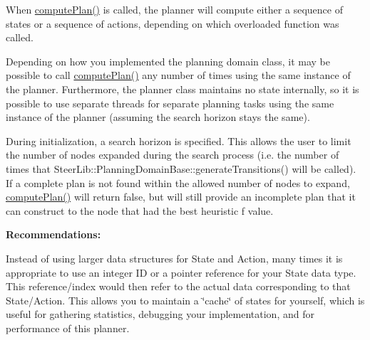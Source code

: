 \begin{DoxyItemize}
\item When \hyperlink{class_best_first_search_planner_a777fb06939a33b3f3effb24b0dbda076}{compute\-Plan()} is called, the planner will compute either a sequence of states or a sequence of actions, depending on which overloaded function was called.
\end{DoxyItemize}


\begin{DoxyItemize}
\item Depending on how you implemented the planning domain class, it may be possible to call \hyperlink{class_best_first_search_planner_a777fb06939a33b3f3effb24b0dbda076}{compute\-Plan()} any number of times using the same instance of the planner. Furthermore, the planner class maintains no state internally, so it is possible to use separate threads for separate planning tasks using the same instance of the planner (assuming the search horizon stays the same).
\end{DoxyItemize}


\begin{DoxyItemize}
\item During initialization, a search horizon is specified. This allows the user to limit the number of nodes expanded during the search process (i.\-e. the number of times that Steer\-Lib\-::\-Planning\-Domain\-Base\-::generate\-Transitions() will be called). If a complete plan is not found within the allowed number of nodes to expand, \hyperlink{class_best_first_search_planner_a777fb06939a33b3f3effb24b0dbda076}{compute\-Plan()} will return false, but will still provide an incomplete plan that it can construct to the node that had the best heuristic f value.
\end{DoxyItemize}

{\bfseries  Recommendations\-: }


\begin{DoxyItemize}
\item Instead of using larger data structures for State and Action, many times it is appropriate to use an integer I\-D or a pointer reference for your State data type. This reference/index would then refer to the actual data corresponding to that State/\-Action. This allows you to maintain a \char`\"{}cache\char`\"{} of states for yourself, which is useful for gathering statistics, debugging your implementation, and for performance of this planner.
\end{DoxyItemize}


